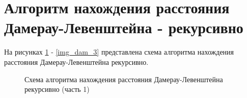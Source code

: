 \section{Алгоритм нахождения расстояния Дамерау-Левенштейна - рекурсивно}
На рисунках \ref{img_dam_1} - \ref{img_dam_3} представлена схема алгоритма нахождения расстояния Дамерау-Левенштейна рекурсивно.

\begin{figure}[p]
	\caption{Схема алгоритма нахождения расстояния Дамерау-Левенштейна рекурсивно (часть 1)}
	\label{img_dam_1}
\end{figure}
